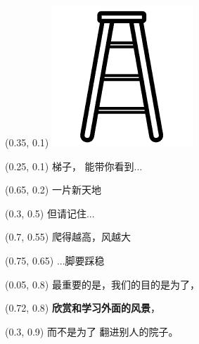 \documentclass{beamer}
\begin{document}
\begin{frame}
    \begin{textblock*}{\textwidth}(0.35\paperwidth, 0.1\paperheight)
        \includegraphics[height=0.8\paperheight]{assets/梯子.png}
    \end{textblock*}


    \begin{textblock*}{6cm}(0.25\paperwidth, 0.1\paperheight)
        \Large 梯子，
        \normalsize 能带你看到...
    \end{textblock*}

    \begin{textblock*}{7cm}(0.65\paperwidth, 0.2\paperheight)
        \huge 一片新天地
    \end{textblock*}

    \begin{textblock*}{5cm}(0.3\paperwidth, 0.5\paperheight)
        \large 但请记住...
    \end{textblock*}

    \begin{textblock*}{6.5cm}(0.7\paperwidth, 0.55\paperheight)
        \Large 爬得越高，风越大
    \end{textblock*}
    
    \begin{textblock*}{5cm}(0.75\paperwidth, 0.65\paperheight)
        \small ...脚要踩稳
    \end{textblock*}

    \begin{textblock*}{12cm}(0.05\paperwidth, 0.8\paperheight)
        \large 最重要的是，我们的目的是为了，
    \end{textblock*}
    \begin{textblock*}{12cm}(0.72\paperwidth, 0.8\paperheight)
        \large \textbf{欣赏和学习外面的风景}，
    \end{textblock*}
    \begin{textblock*}{12cm}(0.3\paperwidth, 0.9\paperheight)
        \large 而不是为了 \alert{翻进别人的院子}。
    \end{textblock*}

\end{frame}
\end{document}
